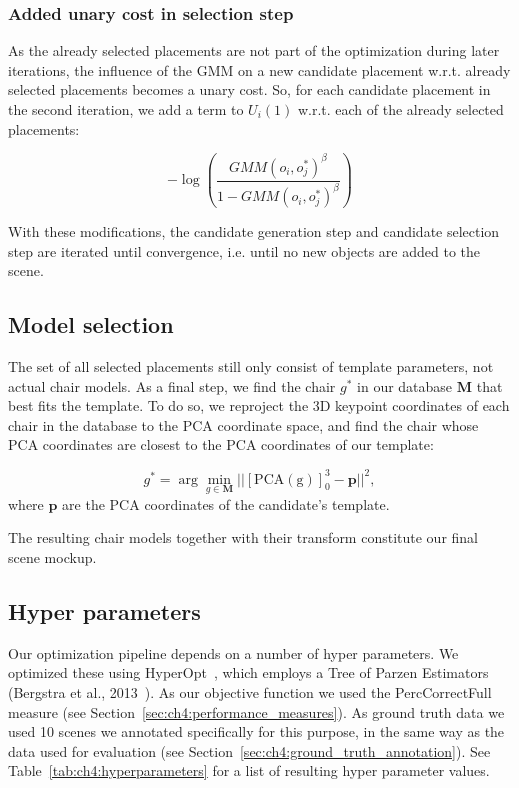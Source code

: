 \documentclass[10pt,twocolumn,letterpaper]{article}
\newcommand{\bb}[1]{{\bm{#1}}}
\begin{document}
\subsubsection{Added unary cost in selection step}
As the already selected placements are not part of the optimization during later iterations,
the influence of the GMM on a new candidate placement w.r.t. already selected placements becomes
a unary cost. So, for each candidate placement in the second iteration, we add a term to $U_i(1)$
w.r.t. each of the already selected placements:

\[ -\log(\frac{GMM(o_i, o^*_j)^\beta}{1 - GMM(o_i, o^*_j)^\beta}) \]

With these modifications, the candidate generation step and candidate selection
step are iterated until convergence, i.e. until no new objects are added to the
scene.

\subsection{Model selection}
\label{sec:ch4:model_selection}
The set of all selected placements still only consist of template parameters, not actual chair models.
As a final step, we find the chair $g^*$ in our database $\bb{M}$ that best fits the
template. To do so, we reproject the 3D keypoint coordinates of each chair in
the database to the PCA coordinate space, and find the chair whose PCA
coordinates are closest to the PCA coordinates of our template:

\[ g^* = \arg\min_{g \in \bb{M}} ||[\mathrm{PCA(g)}]_0^3 - \bb{p}||^2, \]
where $\bb{p}$ are the PCA coordinates of the candidate's template.

The resulting chair models together with their transform constitute our final scene mockup.

\subsection{Hyper parameters}
Our optimization pipeline depends on a number of hyper parameters. We optimized
these using HyperOpt~\cite{HyperOpt}, which employs a Tree of Parzen Estimators (Bergstra et al., 2013~\cite{Bergstra:2013:ICML}).
As our objective function we used the PercCorrectFull measure (see Section~\ref{sec:ch4:performance_measures}).
As ground truth data we used 10 scenes we annotated specifically for this purpose,
in the same way as the data used for evaluation (see Section~\ref{sec:ch4:ground_truth_annotation}).
See Table~\ref{tab:ch4:hyperparameters} for a list of resulting hyper parameter values.
\end{document}
